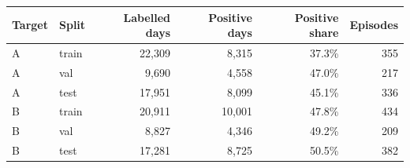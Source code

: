 \begin{tabular}{@{}llrrrr@{}}
\toprule
Target & Split & Labelled days & Positive days & Positive share & Episodes \\
\midrule
A & train & 22{,}309 & 8{,}315 & 37.3\% & 355 \\
A & val & 9{,}690 & 4{,}558 & 47.0\% & 217 \\
A & test & 17{,}951 & 8{,}099 & 45.1\% & 336 \\
B & train & 20{,}911 & 10{,}001 & 47.8\% & 434 \\
B & val & 8{,}827 & 4{,}346 & 49.2\% & 209 \\
B & test & 17{,}281 & 8{,}725 & 50.5\% & 382 \\
\bottomrule
\end{tabular}
